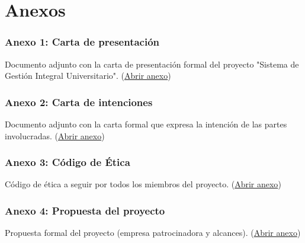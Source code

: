 \chapter{Anexos}

\subsection*{Anexo 1: Carta de presentación}
\label{anexo:carta_presentacion}
\parbox{\linewidth}{%
Documento adjunto con la carta de presentación formal del proyecto "Sistema de Gestión Integral Universitario".
(\href{https://drive.google.com/file/d/1ZiMqNbFV13NKYQdoq0BSWwP7N5zLHqEC/view?usp=sharing}{Abrir anexo})
}

\subsection*{Anexo 2: Carta de intenciones}
\label{anexo:carta_intenciones}
\parbox{\linewidth}{%
Documento adjunto con la carta formal que expresa la intención de las partes involucradas.
(\href{https://docs.google.com/document/d/1mUg4rNGD-5bXCqqc1IveIhCw3kNjwFzT/edit?usp=sharing&ouid=101041738052125290143&rtpof=true&sd=true}{Abrir anexo})
}

\subsection*{Anexo 3: Código de Ética}
\label{anexo:codigo_etica}
\parbox{\linewidth}{%
Código de ética a seguir por todos los miembros del proyecto.
(\href{https://drive.google.com/file/d/1UWY2H4dAQ1W3nxtcGwQE1XzGkuUX-IoS/view?usp=sharing}{Abrir anexo})
}

\subsection*{Anexo 4: Propuesta del proyecto}
\label{anexo:propuesta_proyecto}
\parbox{\linewidth}{%
Propuesta formal del proyecto (empresa patrocinadora y alcances).
(\href{https://docs.google.com/document/d/13UJsHS4BudBLwkDqmcAJCtjnNyk6dAAS/edit?usp=sharing&ouid=101041738052125290143&rtpof=true&sd=true}{Abrir anexo})
}

